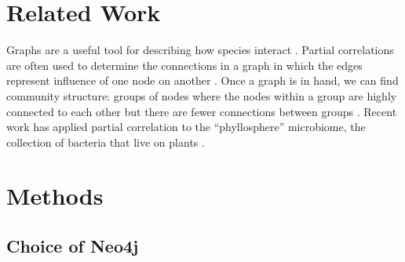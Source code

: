 \documentclass[12pt]{article}
\begin{document}


\section{Related Work}

Graphs are a useful tool for describing how species interact \cite{borthagaray2014inferring}.
Partial correlations are often used to determine the connections in a graph in which the edges represent influence of one node on another \cite{hero2012hub}. 
Once a graph is in hand, we can find community structure: groups of nodes where the nodes within a group are highly connected to each other but there are fewer connections between groups \cite{girvan2002community}.
Recent work has applied partial correlation to the ``phyllosphere'' microbiome, the collection of bacteria that live on plants \cite{agler2016microbial}.


\section{Methods} %

\subsection{Choice of Neo4j}
\end{document}

